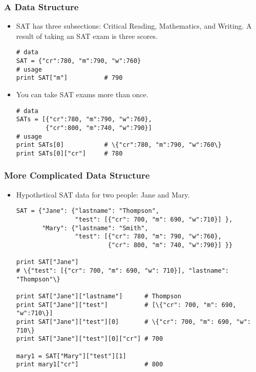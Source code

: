 \documentclass{beamer}
\begin{document}
\begin{frame}[fragile]
\frametitle{A Data Structure}
\begin{itemize}
\item<1-> SAT has three subsections: Critical Reading,
  Mathematics, and Writing. A result of taking an
  SAT exam is three scores. 
\begin{lstlisting}
# data
SAT = {"cr":780, "m":790, "w":760}
# usage
print SAT["m"]          # 790
\end{lstlisting}
\item<2-> You can take SAT exams more than once.
\begin{lstlisting}
# data
SATs = [{"cr":780, "m":790, "w":760},
        {"cr":800, "m":740, "w":790}]
# usage
print SATs[0]           # \{"cr":780, "m":790, "w":760\}
print SATs[0]["cr"]     # 780
\end{lstlisting}
\end{itemize}
\end{frame}

\begin{frame}[fragile]
\frametitle{More Complicated Data Structure}
\begin{itemize}
\item Hypothetical SAT data for two people: Jane and Mary.
\begin{lstlisting}
SAT = {"Jane": {"lastname": "Thompson",
                "test": [{"cr": 700, "m": 690, "w":710}] },
       "Mary": {"lastname": "Smith", 
                "test": [{"cr": 780, "m": 790, "w":760},
                         {"cr": 800, "m": 740, "w":790}] }}

print SAT["Jane"]
# \{"test": [{"cr": 700, "m": 690, "w": 710}], "lastname": "Thompson"\}

print SAT["Jane"]["lastname"]      # Thompson
print SAT["Jane"]["test"]          # [\{"cr": 700, "m": 690, "w":710\}] 
print SAT["Jane"]["test"][0]       # \{"cr": 700, "m": 690, "w": 710\}
print SAT["Jane"]["test"][0]["cr"] # 700

mary1 = SAT["Mary"]["test"][1]
print mary1["cr"]                  # 800
\end{lstlisting}
\end{itemize}
\end{frame}
\end{document}

